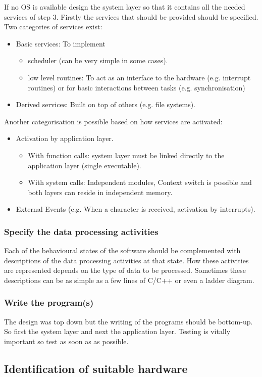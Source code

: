 \documentclass[../main.tex]{subfiles}
\begin{document}
If no OS is available design the system layer so that it contains all the needed services of step 3.
Firstly the services that should be provided should be specified. 
Two categories of services exist: 
\begin{itemize}
	\item Basic services: To implement
	\begin{itemize}
		\item scheduler (can be very simple in some cases).
		\item low level routines: To act as an interface to the hardware (e.g. interrupt routines) or for basic interactions between tasks (e.g. synchronisation)
	\end{itemize}
	
	\item Derived services: Built on top of others (e.g. file systems).
\end{itemize}

Another categorisation is possible based on how services are activated: 
\begin{itemize}
	\item Activation by application layer. 
	\begin{itemize}
		\item With function calls: system layer must be linked directly to the application layer (single executable). 
		\item With system calls: Independent modules, Context switch is possible and both layers can reside in independent memory.  
	\end{itemize}
	\item External Events (e.g. When a character is received, activation by interrupts). 
\end{itemize}

\subsubsection{Specify the data processing activities}
\label{sss:activities}
Each of the behavioural states of the software should be complemented with descriptions of the data processing activities at that state.
How these activities are represented depends on the type of data to be processed.
Sometimes these descriptions can be as simple as a few lines of C/C++ or even a ladder diagram.




\subsubsection{Write the program(s)}
\label{sss:write}
The design was top down but the writing of the programs should be bottom-up. So first the system layer and next the application layer. 
Testing is vitally important so test as soon as as possible.



\subsection{Identification of suitable hardware}
\end{document}
